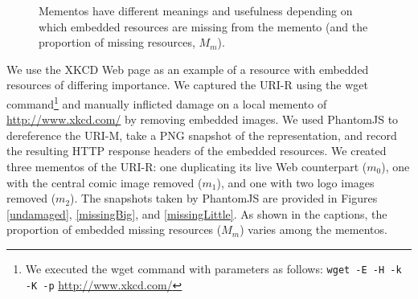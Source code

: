 \begin{figure}[h!t]
\begin{center}
    \qquad
  \end{center}
  \caption{Mementos have different meanings and usefulness depending on which embedded resources are missing from the memento (and the proportion of missing resources, $M_m$).}
  \label{xkcdImgs}
\end{figure}

We use the XKCD Web page as an example of a resource with embedded resources of differing importance. We captured the URI-R using the wget \cite{wget} command\footnote{We executed the wget command with parameters as follows: \texttt{wget -E -H -k -K -p} \url{http://www.xkcd.com/}} and manually inflicted damage on a local memento of \url{http://www.xkcd.com/} by removing embedded images. We used PhantomJS \cite{pjs} to dereference the URI-M, take a PNG snapshot of the representation, and record the resulting HTTP response headers of the embedded resources. We created three mementos of the URI-R: one duplicating its live Web counterpart 
($m_0$), one with the central comic image removed ($m_1$), and one with two logo images removed ($m_2$). The snapshots taken by PhantomJS are provided in Figures \ref{undamaged}, \ref{missingBig}, and \ref{missingLittle}. As shown in the captions, the proportion of embedded missing resources ($M_m$) varies among the mementos.

